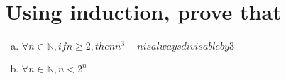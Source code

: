 \section{Using induction, prove that}
\begin{enumerate}[(a)]
\item $\forall n \in \mathbb{N}, if n\geq 2, then n^3-n is always divisable by 3$
\item $\forall n \in \mathbb{N},n < 2^n$
\end{enumerate}




